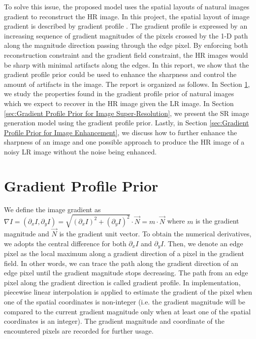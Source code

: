\documentclass[a4paper,11pt]{article}
\begin{document}
To solve this issue, the proposed model uses the spatial layouts of natural images gradient to reconstruct the HR image. In this project, the spatial layout of image gradient is described by gradient profile \cite{sr11}. The gradient profile is expressed by an increasing sequence of gradient magnitudes of the pixels crossed by the 1-D path along the magnitude direction passing through the edge pixel. By enforcing both reconstruction constraint and the gradient field constraint, the HR images would be sharp with minimal artifacts along the edges. In this report, we show that the gradient profile prior could be used to enhance the sharpness and control the amount of artifacts in the image. The report is organized as follows. In Section \ref{sec:Gradient Profile Prior}, we study the properties found in the gradient profile prior of natural images which we expect to recover in the HR image given the LR image. In Section \ref{sec:Gradient Profile Prior for Image Super-Resolution}, we present the SR image generation model using the gradient profile prior. Lastly, in Section \ref{sec:Gradient Profile Prior for Image Enhancement}, we discuss how to further enhance the sharpness of an image and one possible approach to produce the HR image of a noisy LR image without the noise being enhanced.

\section{Gradient Profile Prior}
\label{sec:Gradient Profile Prior}

We define the image gradient as $\nabla I = (\partial_x I, \partial_y I) = \sqrt{(\partial_x I)^2 + (\partial_y I)^2} \cdot \vec{N} = m \cdot \vec{N} $ where $m$ is the gradient magnitude and $\vec{N}$ is the gradient unit vector. To obtain the numerical derivatives, we adopts the central difference for both $\partial_x I$ and $\partial_y I$. Then, we denote an edge pixel as the local maximum along a gradient direction of a pixel in the gradient field. In other words, we can trace the path along the gradient direction of an edge pixel until the gradient magnitude stops decreasing. The path from an edge pixel along the gradient direction is called gradient profile. In implementation, piecewise linear interpolation is applied to estimate the gradient of the pixel when one of the spatial coordinates is non-integer (i.e. the gradient magnitude will be compared to the current gradient magnitude only when at least one of the spatial coordinates is an integer). The gradient magnitude and coordinate of the encountered pixels are recorded for further usage.
\end{document}
